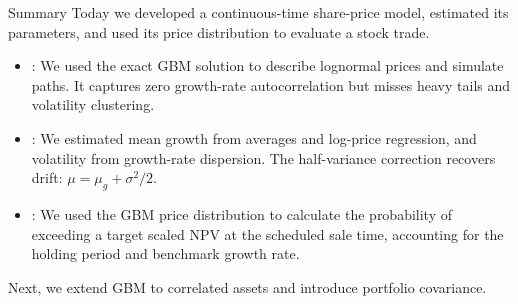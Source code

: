 \documentclass[aspectratio=169,11pt]{beamer}
\newcommand{\mug}{\mu_g}
\begin{document}
\begin{frame}{Summary}
  Today we developed a continuous-time share-price model, estimated its
  parameters, and used its price distribution to evaluate a stock trade.

  \vspace{0.3em}
  {\large\textbf{}}
  \vspace{0.2em}
  \begin{itemize}\setlength{\itemsep}{0.35em}
    \item {}: We used the exact GBM solution
      to describe lognormal prices and simulate paths. It captures zero growth-rate
      autocorrelation but misses heavy tails and volatility clustering.
    \item {}: We estimated mean growth
      from averages and log-price regression, and volatility from growth-rate
      dispersion. The half-variance correction recovers drift: $\mu=\mug+\sigma^2/2$.
    \item {}: We used the GBM price
      distribution to calculate the probability of exceeding a target scaled
      NPV at the scheduled sale time, accounting for the holding period and
      benchmark growth rate.
  \end{itemize}

  \vspace{0.4em}
  Next, we extend GBM to correlated assets and introduce portfolio covariance.
\end{frame}

\end{document}
